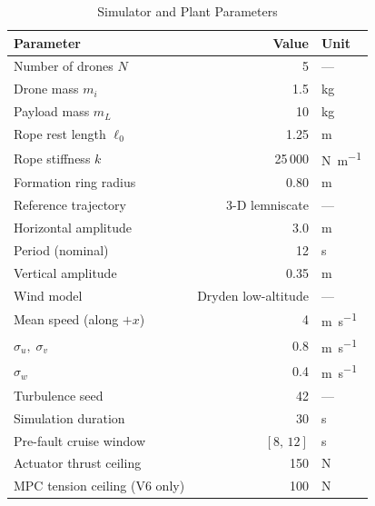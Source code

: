 \begin{table}[htbp]
  \caption{Simulator and Plant Parameters}
  \label{tab:sim-params}
  \centering
  \begin{tabular}{lrl}
    \toprule
    Parameter                        & Value     & Unit                       \\
    \midrule
    Number of drones $N$             & 5         & ---                        \\
    Drone mass $m_i$                 & 1.5       & \si{\kilo\gram}            \\
    Payload mass $m_L$               & 10        & \si{\kilo\gram}            \\
    Rope rest length $\ell_0$        & 1.25      & \si{\metre}                \\
    Rope stiffness $k$               & 25\,000   & \si{\newton\per\metre}     \\
    Formation ring radius            & 0.80      & \si{\metre}                \\
    Reference trajectory             & 3-D lemniscate & ---               \\
    \quad Horizontal amplitude       & 3.0       & \si{\metre}                \\
    \quad Period (nominal)           & 12        & \si{\second}               \\
    \quad Vertical amplitude         & 0.35      & \si{\metre}                \\
    Wind model                       & Dryden low-altitude & ---          \\
    \quad Mean speed (along $+x$)    & 4         & \si{\metre\per\second}     \\
    \quad $\sigma_u,\;\sigma_v$      & 0.8       & \si{\metre\per\second}     \\
    \quad $\sigma_w$                 & 0.4       & \si{\metre\per\second}     \\
    Turbulence seed                  & 42        & ---                        \\
    Simulation duration              & 30        & \si{\second}               \\
    Pre-fault cruise window          & $[8,\,12]$  & \si{\second}             \\
    Actuator thrust ceiling          & 150       & \si{\newton}               \\
    MPC tension ceiling (V6 only)    & 100       & \si{\newton}               \\
    \bottomrule
  \end{tabular}
\end{table}

